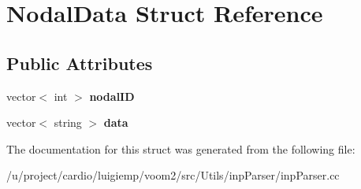 \hypertarget{struct_nodal_data}{
\section{NodalData Struct Reference}
\label{struct_nodal_data}
}
\subsection*{Public Attributes}
\begin{DoxyCompactItemize}
\item 
\hypertarget{struct_nodal_data_a63f8b2f730e110c222f37356c9954a66}{
vector$<$ int $>$ {\bfseries nodalID}}
\label{struct_nodal_data_a63f8b2f730e110c222f37356c9954a66}

\item 
\hypertarget{struct_nodal_data_afbcf8d70a430b845dcf83c2ba9d04dc7}{
vector$<$ string $>$ {\bfseries data}}
\label{struct_nodal_data_afbcf8d70a430b845dcf83c2ba9d04dc7}

\end{DoxyCompactItemize}


The documentation for this struct was generated from the following file:\begin{DoxyCompactItemize}
\item 
/u/project/cardio/luigiemp/voom2/src/Utils/inpParser/inpParser.cc\end{DoxyCompactItemize}
